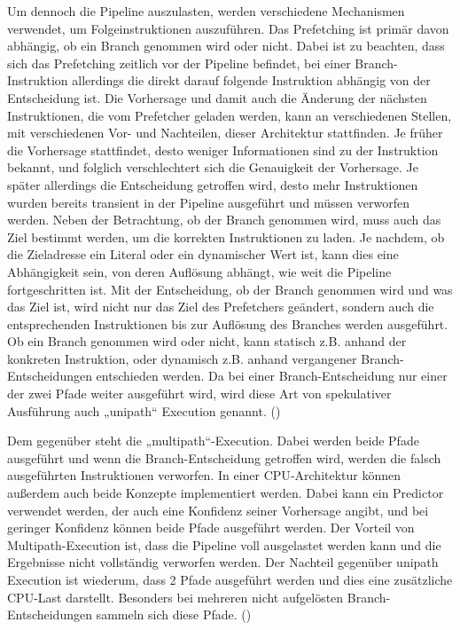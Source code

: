Um dennoch die Pipeline auszulasten, werden verschiedene
Mechanismen verwendet, um Folgeinstruktionen auszuführen. Das
Prefetching ist primär davon abhängig, ob ein Branch genommen
wird oder nicht. Dabei ist zu beachten, dass sich das Prefetching
zeitlich vor der Pipeline befindet, bei einer Branch-Instruktion
allerdings die direkt darauf folgende Instruktion abhängig von der
Entscheidung ist. Die Vorhersage und damit auch die Änderung der
nächsten Instruktionen, die vom Prefetcher geladen werden, kann
an verschiedenen Stellen, mit verschiedenen Vor- und Nachteilen,
dieser Architektur stattfinden. Je früher die Vorhersage
stattfindet, desto weniger Informationen sind zu der
Instruktion bekannt, und folglich verschlechtert sich die
Genauigkeit der Vorhersage. Je später allerdings die Entscheidung
getroffen wird, desto mehr Instruktionen wurden bereits transient
in der Pipeline ausgeführt und müssen verworfen werden. Neben der
Betrachtung, ob der Branch genommen wird, muss auch das Ziel
bestimmt werden, um die korrekten Instruktionen zu laden. Je
nachdem, ob die Zieladresse ein Literal oder ein dynamischer Wert
ist, kann dies eine Abhängigkeit sein, von deren Auflösung
abhängt, wie weit die Pipeline fortgeschritten ist. Mit der
Entscheidung, ob der Branch genommen wird und was das Ziel ist,
wird nicht nur das Ziel des Prefetchers geändert, sondern auch
die entsprechenden Instruktionen bis zur Auflösung des Branches
werden ausgeführt. Ob ein Branch genommen wird oder nicht, kann
statisch z.B. anhand der konkreten Instruktion, oder dynamisch
z.B. anhand vergangener Branch-Entscheidungen entschieden werden.
Da bei einer Branch-Entscheidung nur einer der zwei Pfade weiter
ausgeführt wird, wird diese Art von spekulativer Ausführung auch
„unipath“ Execution genannt.
(\cite[40,42-48,136]{kaeli_speculative_2005})

Dem gegenüber steht die „multipath“-Execution. Dabei werden beide
Pfade ausgeführt und wenn die Branch-Entscheidung getroffen wird,
werden die falsch ausgeführten Instruktionen verworfen. In
einer \ac{CPU}-Architektur können außerdem auch beide Konzepte
implementiert werden. Dabei kann ein Predictor verwendet werden,
der auch eine Konfidenz seiner Vorhersage angibt, und bei geringer
Konfidenz können beide Pfade ausgeführt werden. Der Vorteil von
Multipath-Execution ist, dass die Pipeline voll ausgelastet
werden kann und die Ergebnisse nicht vollständig verworfen
werden. Der Nachteil gegenüber unipath Execution ist wiederum,
dass 2 Pfade ausgeführt werden und dies eine zusätzliche
\ac{CPU}-Last darstellt. Besonders bei mehreren nicht aufgelösten
Branch-Entscheidungen sammeln sich diese Pfade.
(\cite[136,137]{kaeli_speculative_2005})


